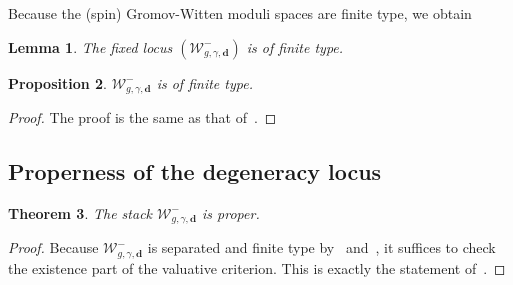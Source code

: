 \documentclass{amsart}
\newtheorem{thm}{Theorem}[section]
\newtheorem{prop}[thm]{Proposition}
\newtheorem{lem}[thm]{Lemma}
\theoremstyle{definition}
\theoremstyle{remark}
\theoremstyle{plain}
\theoremstyle{definition}
\theoremstyle{remark}
\newcommand{\mc}[1]{\mathcal{#1}}
\newcommand{\mbf}[1]{\mathbf{#1}}
\newcommand{\1}{\mathbf{1}}
\newcommand{\2}{\mathbf{2}}
\newcommand{\3}{\mathbf{3}}
\begin{document}
Because the (spin) Gromov-Witten moduli spaces are finite type, we obtain
\begin{lem}
    The fixed locus $(\mc{W}^-_{g,\gamma,\mbf{d}})$ is of finite type.
\end{lem}


\begin{prop}\label{prop:finitetype}
    $\mc{W}^-_{g,\gamma,\mbf{d}}$ is of finite type.
\end{prop}

\begin{proof}
    The proof is the same as that of~\cite[Proposition 3.9]{nmsp}.
\end{proof}

\subsection{Properness of the degeneracy locus}

\begin{thm}
    The stack $\mc{W}^-_{g,\gamma,\mbf{d}}$ is proper.
\end{thm}

\begin{proof}
    Because $\mc{W}^-_{g,\gamma,\mbf{d}}$ is separated and finite type by~ and~, it suffices to check the existence part of the valuative criterion. This is exactly the statement of~.
\end{proof}

\printbibliography
\end{document}

